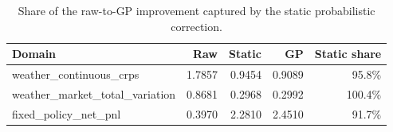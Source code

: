 \begin{table}[htbp]
\centering
\caption{Share of the raw-to-GP improvement captured by the static probabilistic correction.}
\label{tab:cross-stage-attribution}
\begin{tabular}{lrrrr}
\toprule
Domain & Raw & Static & GP & Static share \\
\midrule
weather\_continuous\_crps & 1.7857 & 0.9454 & 0.9089 & 95.8\% \\
weather\_market\_total\_variation & 0.8681 & 0.2968 & 0.2992 & 100.4\% \\
fixed\_policy\_net\_pnl & 0.3970 & 2.2810 & 2.4510 & 91.7\% \\
\bottomrule
\end{tabular}
\end{table}
